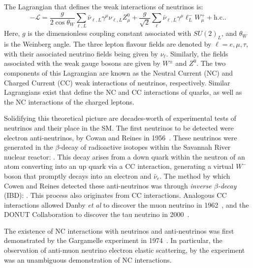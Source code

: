 The Lagrangian that defines the weak interactions of neutrinos is:
\begin{equation}
    -\mathcal{L} = \frac{g}{2\cos{\theta_{W}}}\sum_{\ell,L}\bar{\nu}_{\ell,L}\gamma^{\mu}\nu_{\ell,L}Z^{0}_{\mu}
    +\frac{g}{\sqrt{2}}\sum_{\ell}\bar{\nu}_{\ell,L}\gamma^{\mu}\ell^{-}_{L}W^{+}_{\mu} + \mathrm{h.c.}.
\end{equation}
Here, $g$ is the dimensionless coupling constant associated with $SU(2)_{L}$, and $\theta_{W}$ is the Weinberg angle. The three lepton flavour fields are denoted by $\ell=e,\mu,\tau$, with their associated neutrino fields being given by $\nu_{\ell}$. Similarly, the fields associated with the weak gauge bosons are given by $W^{\pm}$ and $Z^{0}$. The two components of this Lagrangian are known as the Neutral Current (NC) and Charged Current (CC) weak interactions of neutrinos, respectively. Similar Lagrangians exist that define the NC and CC interactions of quarks, as well as the NC interactions of the charged leptons.

Solidifying this theoretical picture are decades-worth of experimental tests of neutrinos and their place in the SM. The first neutrinos to be detected were electron anti-neutrinos, by Cowan and Reines in 1956~\cite{cowanDetectionFreeNeutrino1956,reinesNeutrino1956}. %
These neutrinos were generated in the $\beta$-decay of radioactive isotopes within the Savannah River nuclear reactor: . This decay arises from a down quark within the neutron of an atom converting into an up quark via a CC interaction, generating a virtual $W^{-}$ boson that promptly decays into an electron and $\bar{\nu}_{e}$. The method by which Cowen and Reines detected these anti-neutrinos was through \textit{inverse $\beta$-decay} (IBD): . This process also originates from CC interactions. Analogous CC interactions allowed Danby \textit{et al} to discover the muon neutrino in 1962~\cite{danbyObservationHighEnergyNeutrino1962}, %
and the DONUT Collaboration to discover the tau neutrino in 2000~\cite{kodamaObservationTauNeutrino2001}. %

The existence of NC interactions with neutrinos and anti-neutrinos was first demonstrated by the Gargamelle experiment in 1974~\cite{hasertObservationNeutrinolikeInteractions1973,hasertSearchElasticMuonneutrino1973,hasertObservationNeutrinolikeInteractions1974,blietschauEvidenceLeptonicNeutral1976}. %
In particular, the observation of anti-muon neutrino electron elastic scattering,  by the experiment was an unambiguous demonstration of NC interactions.

